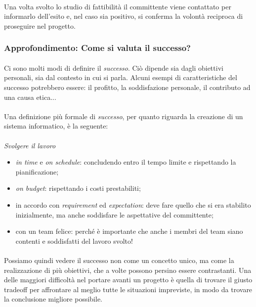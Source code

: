 \documentclass[11pt,a4paper,english]{article}
\begin{document}
\paragraph{} Una volta svolto lo studio di fattibilità il committente viene contattato per informarlo dell'esito e, nel caso sia positivo, si conferma la volontà reciproca di proseguire nel progetto.


\subsubsection{Approfondimento: Come si valuta il successo?}

\paragraph{} Ci sono molti modi di definire il \emph{successo}. Ciò dipende sia dagli obiettivi personali, sia dal contesto in cui si parla. Alcuni esempi di caratteristiche del successo potrebbero essere: il profitto, la soddisfazione personale, il contributo ad una causa etica...

\paragraph{} Una definizione più formale di \emph{successo}, per quanto riguarda la creazione di un sistema informatico, è la seguente:

\paragraph{}
\emph{Svolgere il lavoro}
\begin{itemize}
    \item \emph{in time} e \emph{on schedule}: concludendo entro il tempo limite e rispettando la pianificazione;
    \item \emph{on budget}: rispettando i costi prestabiliti;
    \item in accordo con \emph{requirement} ed \emph{expectation}: deve fare quello che si era stabilito inizialmente, ma anche soddisfare le aspettative del committente;
    \item con un team felice: perché è importante che anche i membri del team siano contenti e soddisfatti del lavoro svolto! 
\end{itemize}

\paragraph{} Possiamo quindi vedere il successo non come un concetto unico, ma come la realizzazione di più obiettivi, che a volte possono persino essere contrastanti. Una delle maggiori difficoltà nel portare avanti un progetto è quella di trovare il giusto tradeoff per affrontare al meglio tutte le situazioni impreviste, in modo da trovare la conclusione migliore possibile. 
\end{document}
